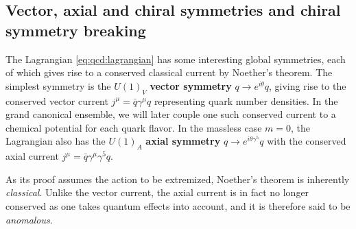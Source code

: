 \subsection*{Vector, axial and chiral symmetries and chiral symmetry breaking}

The Lagrangian \eqref{eq:qcd:lagrangian} has some interesting global symmetries, each of which gives rise to a conserved classical current by Noether's theorem.
The simplest symmetry is the $U(1)_V$ \textbf{vector symmetry} $q \rightarrow e^{i \theta} q$, giving rise to the conserved vector current $j^\mu = \bar{q} \gamma^\mu q$ representing quark number densities.
In the grand canonical ensemble, we will later couple one such conserved current to a chemical potential for each quark flavor.
In the massless case $m = 0$, the Lagrangian also has the $U(1)_A$ \textbf{axial symmetry} $q \rightarrow e^{i \theta \gamma^5} q$ with the conserved axial current $j^\mu = \bar{q} \gamma^\mu \gamma^5 q$.

As its proof assumes the action to be extremized, Noether's theorem is inherently \emph{classical}.
Unlike the vector current, the axial current is in fact no longer conserved as one takes quantum effects into account,
and it is therefore said to be \emph{anomalous}.
\cite[equation (28.20)]{ref:schwartz}

